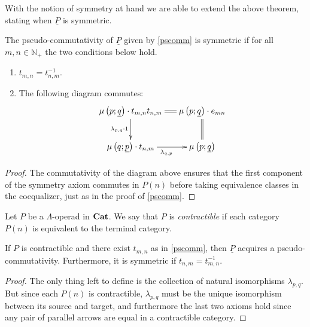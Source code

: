 With the notion of symmetry at hand we are able to extend the above theorem, stating when $\underline{P}$ is symmetric.
\begin{thm}
The pseudo-commutativity of $\underline{P}$ given by \cref{pscomm}  is symmetric if for all $m,n \in \mathbb{N}_+$ the two conditions below hold.
    \begin{enumerate}
        \item $t_{m,n} = t_{n,m}^{-1}$.
        \item The following diagram commutes:
          \[
              \xy
                (0,0)*+{\mu\left(p;\underline{q}\right) \cdot t_{m,n}t_{n,m}}="00";
                (30,0)*+{\mu\left(p;\underline{q}\right) \cdot e_{mn}}="10";
                (0,-15)*+{\mu\left(q;\underline{p}\right) \cdot t_{n,m}}="01";
                (30,-15)*+{\mu\left(p;\underline{q}\right)}="11";
                {\ar@{=} "00" ; "10"};
                {\ar_{\lambda_{p,q} \cdot 1} "00" ; "01"};
                {\ar@{=} "10" ; "11"};
                {\ar_{\lambda_{q,p}} "01" ; "11"};
              \endxy
          \]
    \end{enumerate}
\end{thm}
\begin{proof}
The commutativity of the diagram above ensures that the first component of the symmetry axiom commutes in $P(n)$ before taking equivalence classes in the coequalizer, just as in the proof of \cref{pscomm}.
\end{proof}

\begin{Defi}
Let $P$ be a $\Lambda$-operad in $\mathbf{Cat}$. We say that $P$ is \textit{contractible} if each category $P(n)$ is equivalent to the terminal category.
\end{Defi}

\begin{cor}\label{cor:contract-to-psc}
If $P$ is contractible and there exist $t_{m,n}$ as in \cref{pscomm}, then $\underline{P}$ acquires a pseudo-commutativity. Furthermore, it is symmetric if $t_{n,m} = t_{m,n}^{-1}$.
\end{cor}
\begin{proof}
The only thing left to define is the collection of natural isomorphisms $\lambda_{p,q}$. But since each $P(n)$ is contractible, $\lambda_{p,q}$ must be the unique isomorphism between its source and target, and furthermore the last two axioms hold since any pair of parallel arrows are equal in a contractible category.
\end{proof}

